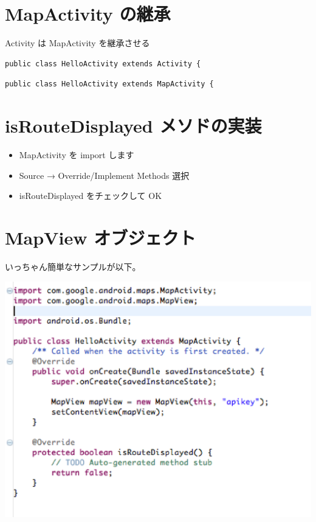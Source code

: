 \documentclass[slide,papersize]{jsarticle}
\begin{document}
\section*{MapActivity の継承}
\medskip
Activity は MapActivity を継承させる
\medskip
{\scriptsize
\begin{verbatim}
public class HelloActivity extends Activity {
\end{verbatim}
}
\medskip
{\scriptsize
\begin{verbatim}
public class HelloActivity extends MapActivity {
\end{verbatim}
}

\section*{isRouteDisplayed メソドの実装}
\bigskip
\begin{itemize}
\item MapActivity を import します
\bigskip
\item Source → Override/Implement Methods 選択
\bigskip
\item isRouteDisplayed をチェックして OK
\end{itemize}

\section*{MapView オブジェクト}
いっちゃん簡単なサンプルが以下。
\begin{center}
\includegraphics[scale=0.28]{MapViewSample.eps}
\end{center}
\end{document}
